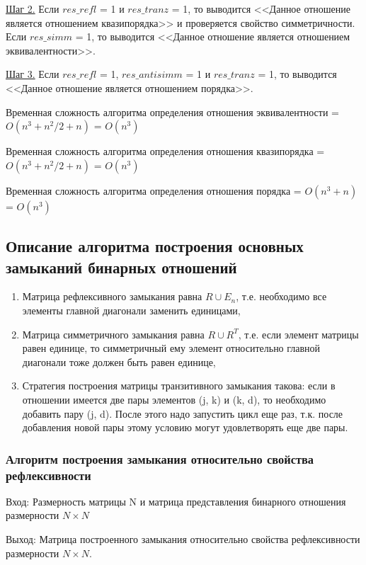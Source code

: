 \documentclass[bachelor, och, labwork]{shiza}
\begin{document}
	\underline{Шаг 2.} Если  $res\_refl$ = 1 и $res\_tranz$ = 1, то выводится <<Данное отношение является отношением квазипорядка>> и проверяется свойство симметричности. Если $res\_simm$ = 1, то выводится <<Данное отношение является отношением эквивалентности>>.
	
	\underline{Шаг 3.} Если $res\_refl$ = 1, $res\_antisimm$ = 1 и $res\_tranz$ = 1, то выводится <<Данное отношение является отношением порядка>>.
	
	
	Временная сложность алгоритма определения отношения эквивалентности = $O(n^3 + n^2/2 + n)$ = $O(n^3)$
	
	Временная сложность алгоритма определения отношения квазипорядка = $O(n^3 + n^2/2 + n)$ = $O(n^3)$
	
	Временная сложность алгоритма определения отношения порядка = $O(n^3 + n)$ = $O(n^3)$
	
	
	\subsection{Описание алгоритма построения основных замыканий бинарных отношений}
	
	\begin{enumerate}
		\item Матрица $\textit{рефлексивного}$ замыкания равна $R \cup E_n$, т.е. необходимо все элементы главной диагонали заменить единицами,
		\item Матрица $\textit{симметричного}$ замыкания равна $R \cup R^T$, т.е. если элемент матрицы равен единице, то симметричный ему элемент относительно главной диагонали тоже должен быть равен единице,
		\item Стратегия построения матрицы $\textit{транзитивного}$ замыкания такова: если в отношении имеется две пары элементов (j, k) и (k, d), то необходимо добавить пару (j, d). После этого надо запустить цикл еще раз, т.к. после добавления новой пары этому условию могут удовлетворять еще две пары. 
	\end{enumerate}

	\subsubsection{Алгоритм построения замыкания относительно свойства рефлексивности}
	
	$\textit{Вход:}$ Размерность матрицы N и матрица представления бинарного отношения размерности $N \times N$
	
	$\textit{Выход:}$  Матрица построенного замыкания относительно свойства рефлексивности размерности $N \times N$.
	
\end{document}
